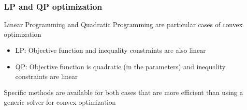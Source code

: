 \documentclass{beamer}
\begin{document}
%
%
%

\begin{frame}

	\frametitle{LP and QP optimization}

Linear Programming and Quadratic Programming are particular cases of convex optimization

	\begin{itemize}
		\item LP: Objective function and inequality constraints are also linear
		\item QP: Objective function is quadratic (in the parameters) and inequality constraints are linear
	\end{itemize}

Specific methods are available for both cases that are more efficient than using a generic solver for convex optimization


\end{frame}
\end{document}
